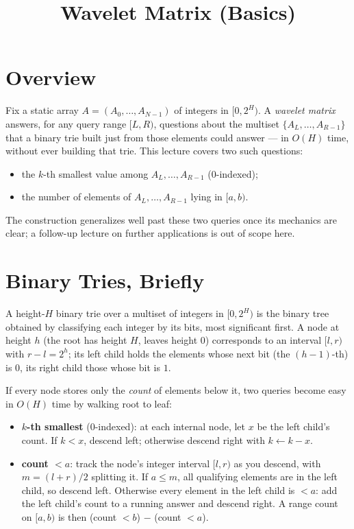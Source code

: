 \documentclass[11pt]{article}
\title{Wavelet Matrix (Basics)}
\author{}
\date{}
\begin{document}
\thispagestyle{fancy}


\section{Overview}
Fix a static array $A = (A_0, \ldots, A_{N-1})$ of integers in
$[0, 2^H)$. A \emph{wavelet matrix} answers, for any query range
$[L, R)$, questions about the multiset $\{A_L, \ldots, A_{R-1}\}$ that a
binary trie built just from those elements could answer --- in
$O(H)$ time, without ever building that trie. This lecture covers two such
questions:

\begin{itemize}[leftmargin=1.5em]
  \item the $k$-th smallest value among $A_L, \ldots, A_{R-1}$ (0-indexed);
  \item the number of elements of $A_L, \ldots, A_{R-1}$ lying in $[a, b)$.
\end{itemize}

The construction generalizes well past these two queries once its
mechanics are clear; a follow-up lecture on further applications is out of
scope here.

\section{Binary Tries, Briefly}
A height-$H$ binary trie over a multiset of integers in $[0, 2^H)$ is the
binary tree obtained by classifying each integer by its bits, most
significant first. A node at height $h$ (the root has height $H$, leaves
height $0$) corresponds to an interval $[l, r)$ with $r - l = 2^h$; its left
child holds the elements whose next bit (the $(h-1)$-th) is $0$, its right
child those whose bit is $1$.

\begin{definitionbox}
If every node stores only the \emph{count} of elements below it, two queries
become easy in $O(H)$ time by walking root to leaf:
\begin{itemize}[leftmargin=1.5em]
  \item \textbf{$k$-th smallest} (0-indexed): at each internal node, let $x$
        be the left child's count. If $k < x$, descend left; otherwise
        descend right with $k \leftarrow k - x$.
  \item \textbf{count $< a$}: track the node's integer interval $[l, r)$ as
        you descend, with $m = (l+r)/2$ splitting it. If $a \le m$, all
        qualifying elements are in the left child, so descend left.
        Otherwise every element in the left child is $< a$: add the left
        child's count to a running answer and descend right. A range count
        on $[a, b)$ is then (count $< b$) $-$ (count $< a$).
\end{itemize}
\end{definitionbox}
\end{document}
